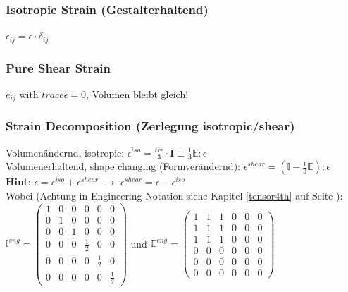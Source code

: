 \documentclass[a4paper]{scrartcl}
\begin{document}
\subsubsection{Isotropic Strain (Gestalterhaltend)}
$\epsilon_{ij} = \epsilon \cdot \delta_{ij} $

\subsubsection{Pure Shear Strain}
$e_{ij}$ with $trace \epsilon = 0$, Volumen bleibt gleich!

\subsubsection{Strain Decomposition (Zerlegung isotropic/shear)}
Volumenändernd, isotropic: $\epsilon^{iso} = \frac{tr \epsilon}{3} \cdot \mathbf{I}
\equiv \frac{1}{3} \mathbb{E} : \epsilon$\\

Volumenerhaltend, shape changing (Formverändernd): $\epsilon^{shear} =
(\mathbb{I} - \frac{1}{3} \mathbb{E} ) : \epsilon $\\
\textbf{Hint}: $\epsilon = \epsilon^{iso} + \epsilon^{shear}$ $\rightarrow$
$\epsilon^{shear} = \epsilon -\epsilon^{iso}$\\
Wobei (Achtung in Engineering
Notation siehe Kapitel \ref{tensor4th} auf Seite \pageref{tensor4th}):\\ $ \mathbb{I}^{eng}=
\begin{pmatrix}
1 & 0 & 0 & 0 & 0 & 0 \\ 
0 & 1 & 0 & 0 & 0 & 0 \\ 
0 & 0 & 1 & 0 & 0 & 0 \\ 
0 & 0 & 0 & \frac{1}{2} & 0 & 0 \\ 
0 & 0 & 0 & 0 & \frac{1}{2} & 0 \\ 
0 & 0 & 0 & 0 & 0 & \frac{1}{2}
\end{pmatrix} 
$ und 
$ \mathbb{E}^{eng}=
\begin{pmatrix}
1 & 1 & 1 & 0 & 0 & 0 \\ 
1 & 1 & 1 & 0 & 0 & 0 \\ 
1 & 1 & 1 & 0 & 0 & 0 \\ 
0 & 0 & 0 & 0 & 0 & 0 \\ 
0 & 0 & 0 & 0 & 0 & 0 \\ 
0 & 0 & 0 & 0 & 0 & 0
\end{pmatrix} 
$
\end{document}
